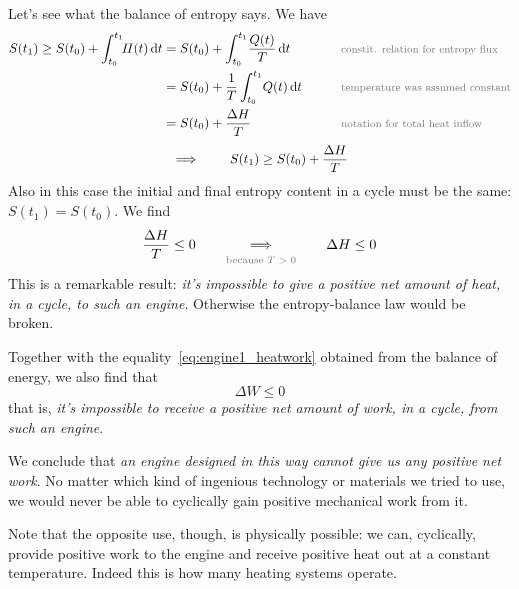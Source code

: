 \documentclass[a4paper,12pt,%
onecolumn,oneside,%
british%
]{memoir}
\newcommand*{\di}{\mathrm{d}}%
\newcommand*{\incr}{\Delta}%
\renewcommand*{\|}[1][]{\nonscript\:#1\vert\nonscript\:\mathopen{}}
\newcommand*{\yti}{t_{0}}
\newcommand*{\ytf}{t_{1}}
\newcommand*{\dt}{\di t}
\newcommand*{\yQ}{Q}%
\newcommand*{\yhe}{\incr H}%
\newcommand*{\yW}{\incr W}%
\newcommand*{\yS}{S}
\newcommand*{\yB}{\varPi}
\newcommand*{\yT}{T}%
\begin{document}
Let's see what the balance of entropy says. We have
\begin{equation*}
  \begin{gathered}
    \begin{aligned}
      \yS(\ytf) \ge \yS(\yti) + \int_{\yti}^{\ytf}\!\!\yB(t)\,\dt
      &= \yS(\yti) + \int_{\yti}^{\ytf}\!\frac{\yQ(t)}{\yT}\,\dt
      &\qquad&{\text{\footnotesize\color{midgrey}constit. relation for entropy flux}}
      \\
      &= \yS(\yti) + \frac{1}{\yT}\int_{\yti}^{\ytf}\!\yQ(t)\,\dt
      &\qquad&{\text{\footnotesize\color{midgrey}temperature was assumed constant}}
      \\
      &= \yS(\yti) + \frac{\yhe}{\yT}
      &\qquad&{\text{\footnotesize\color{midgrey}notation for total heat inflow}}
    \end{aligned}
    \\[\jot]
    \implies\qquad
    \yS(\ytf) \ge \yS(\yti) + \frac{\yhe}{\yT}
  \end{gathered}
\end{equation*}
Also in this case the initial and final entropy content in a cycle must be the same: $\yS(\ytf)=\yS(\yti)$. We find
\begin{equation}\label{eq:engine1_heatminus}
  \frac{\yhe}{\yT} \le 0
  \qquad\underbracket[0pt]{\Longrightarrow}_{\text{\color{midgrey}because $\yT>0$}}\qquad
  \yhe \le 0
\end{equation}
This is a remarkable result: \emph{it's impossible to give a positive net amount of heat, in a cycle, to such an engine}. Otherwise the entropy-balance law would be broken.

Together with the equality~\eqref{eq:engine1_heatwork} obtained from the balance of energy, we also find that
\begin{equation}
  \label{eq:engine1_noposwork}
  \yW \le 0
\end{equation}
that is, \emph{it's impossible to receive a positive net amount of work, in a cycle, from such an engine}.

We conclude that \emph{an engine designed in this way cannot give us any positive net work}. No matter which kind of ingenious technology or materials we tried to use, we would never be able to cyclically gain positive mechanical work from it.

Note that the opposite use, though, is physically possible: we can, cyclically, provide positive work to the engine and receive positive heat out at a constant temperature. Indeed this is how many heating systems operate.
\end{document}
